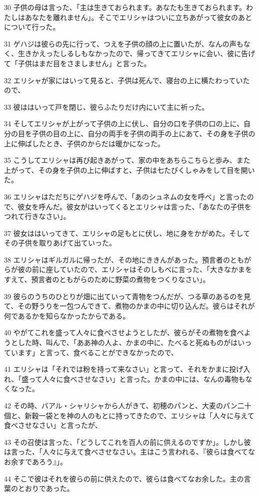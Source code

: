 \par 30 子供の母は言った、「主は生きておられます。あなたも生きておられます。わたしはあなたを離れません」。そこでエリシャはついに立ちあがって彼女のあとについて行った。
\par 31 ゲハジは彼らの先に行って、つえを子供の顔の上に置いたが、なんの声もなく、生きかえったしるしもなかったので、帰ってきてエリシャに会い、彼に告げて「子供はまだ目をさましません」と言った。
\par 32 エリシャが家にはいって見ると、子供は死んで、寝台の上に横たわっていたので、
\par 33 彼ははいって戸を閉じ、彼らふたりだけ内にいて主に祈った。
\par 34 そしてエリシャが上がって子供の上に伏し、自分の口を子供の口の上に、自分の目を子供の目の上に、自分の両手を子供の両手の上にあて、その身を子供の上に伸ばしたとき、子供のからだは暖かになった。
\par 35 こうしてエリシャは再び起きあがって、家の中をあちらこちらと歩み、また上がって、その身を子供の上に伸ばすと、子供は七たびくしゃみをして目を開いた。
\par 36 エリシャはただちにゲハジを呼んで、「あのシュネムの女を呼べ」と言ったので、彼女を呼んだ。彼女がはいってくるとエリシャは言った、「あなたの子供をつれて行きなさい」。
\par 37 彼女ははいってきて、エリシャの足もとに伏し、地に身をかがめた。そしてその子供を取りあげて出ていった。
\par 38 エリシャはギルガルに帰ったが、その地にききんがあった。預言者のともがらが彼の前に座していたので、エリシャはそのしもべに言った、「大きなかまをすえて、預言者のともがらのために野菜の煮物をつくりなさい」。
\par 39 彼らのうちのひとりが畑に出ていって青物をつんだが、つる草のあるのを見て、その野うりを一包つんできて、煮物のかまの中に切り込んだ。彼らはそれが何であるかを知らなかったからである。
\par 40 やがてこれを盛って人々に食べさせようとしたが、彼らがその煮物を食べようとした時、叫んで、「ああ神の人よ、かまの中に、たべると死ぬものがはいっています」と言って、食べることができなかったので、
\par 41 エリシャは「それでは粉を持って来なさい」と言って、それをかまに投げ入れ、「盛って人々に食べさせなさい」と言った。かまの中には、なんの毒物もなくなった。
\par 42 その時、バアル・シャリシャから人がきて、初穂のパンと、大麦のパン二十個と、新穀一袋とを神の人のもとに持ってきたので、エリシャは「人々に与えて食べさせなさい」と言ったが、
\par 43 その召使は言った、「どうしてこれを百人の前に供えるのですか」。しかし彼は言った、「人々に与えて食べさせなさい。主はこう言われる、『彼らは食べてなお余すであろう』」。
\par 44 そこで彼はそれを彼らの前に供えたので、彼らは食べてなお余した。主の言葉のとおりであった。

